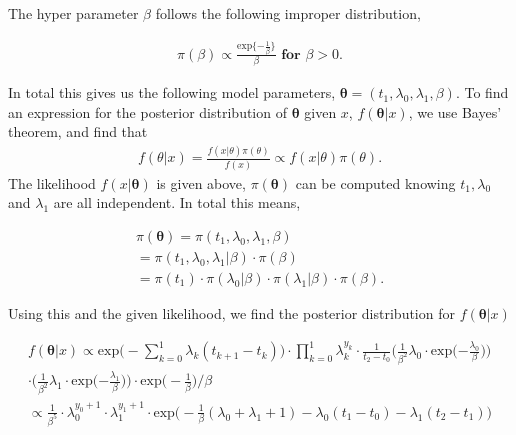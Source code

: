 The hyper parameter $\beta$ follows the following improper distribution,

\begin{align}
    \pi (\beta) \propto \frac{\text{exp}\{ -\frac{1}{\beta} \} }{\beta} \textbf{ for } \beta > 0.
\end{align}

In total this gives us the following model parameters, $\boldsymbol{\theta} = (t_1, \lambda_0, \lambda_1, \beta)$. 
To find an expression for the posterior distribution of $\boldsymbol{\theta}$ given $x$, $f(\boldsymbol{\theta}|x)$, we use Bayes' theorem, and find that 
\begin{align}
    f(\theta|x) = \frac{f(x|\theta) \pi(\theta)}{f(x)} \propto f(x|\theta) \pi(\theta) .
\end{align}
The likelihood $f(x | \boldsymbol{\theta})$ is given above, $\pi(\boldsymbol{\theta})$ can be computed knowing $t_1, \lambda_0$ and $\lambda_1$ are all independent. In total this means,

\begin{align}
    \pi(\boldsymbol{\theta}) 
    = \pi(t_1, \lambda_0, \lambda_1, \beta) \nonumber \\
    = \pi(t_1, \lambda_0, \lambda_1 | \beta) \cdot \pi(\beta) \nonumber \\
    = \pi(t_1) \cdot \pi(\lambda_0|\beta) \cdot \pi(\lambda_1|\beta) \cdot \pi(\beta).
\end{align}

Using this and the given likelihood, we find the posterior distribution for $f(\boldsymbol{\theta}|x)$

\begin{align} \label{eq:post}
    f(\boldsymbol{\theta}|x) \propto \text{exp} \Big( - \sum_{k = 0}^1 \lambda_k (t_{k+1} - t_k) \Big)\cdot \prod_{k = 0}^1 \lambda_k^{y_k} \cdot \frac{1}{t_2-t_0} 
    \Big( \frac{1}{\beta^2} \lambda_0 \cdot
    \text{exp} \Big({-\frac{\lambda_0}{\beta}} \Big)  \Big) \nonumber \\ 
    \cdot \Big( \frac{1}{\beta^2} \lambda_1 \cdot \text{exp} \Big({-\frac{\lambda_1}{\beta}} \Big) \Big) \cdot \text{exp} \Big( -\frac{1}{\beta} \Big)/\beta \nonumber \\
    \propto   \frac{1}{\beta^5} \cdot \lambda_0^{y_0 + 1} \cdot \lambda_1^{y_1 + 1} \cdot \text{exp} \Big( -\frac{1}{\beta}(\lambda_0 + \lambda_1 + 1) - \lambda_0(t_1-t_0) - \lambda_1(t_2-t_1) \Big)
\end{align}




